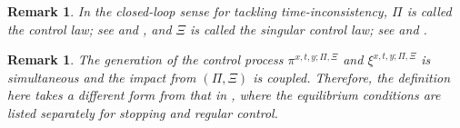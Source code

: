 \documentclass[11pt,reqno]{article}%
\newtheorem{remark}[theorem]{Remark}
\numberwithin{equation}{section}
\begin{document}
\begin{remark}
In the closed-loop sense for tackling time-inconsistency, $\Pi$ is called the control law; see \citet{bjork2017timeinconsistent} and \citet{bjork2021time}, and $\Xi$ is called the singular control law; see \citet{liang2025stackelberg} and \citet{liang2024equilibria}.
\end{remark}

\begin{remark}
The generation of the control process $\pi^{x,t,y;\Pi,\Xi}$ and $\xi^{x,t,y;\Pi,\Xi}$ is simultaneous and the impact from $(\Pi,\Xi)$ is coupled. Therefore, the definition here takes a different form from that in \citet{liang2023weak}, where the equilibrium conditions are listed separately for stopping and regular control.
\end{remark}
\end{document}
